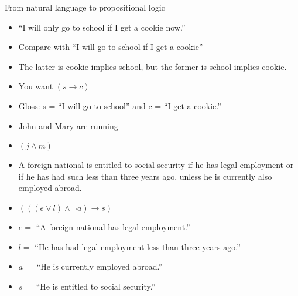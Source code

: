 \documentclass[
  ignorenonframetext,
]{beamer}
\providecommand{\tightlist}{%
  \setlength{\itemsep}{0pt}\setlength{\parskip}{0pt}}
\begin{document}
\begin{frame}{From natural language to propositional logic}
\protect\hypertarget{from-natural-language-to-propositional-logic}{}

\begin{itemize}[<+->]
\tightlist
\item
  ``I will only go to school if I get a cookie now.''
\item
  Compare with ``I will go to school if I get a cookie''
\item
  The latter is cookie implies school, but the former is school implies
  cookie.
\item
  You want \((s \rightarrow c)\)
\item
  Gloss: s = ``I will go to school'' and c = ``I get a cookie.''
\item
  John and Mary are running
\item
  \((j \wedge m)\)
\item
  A foreign national is entitled to social security if he has legal
  employment or if he has had such less than three years ago, unless he
  is currently also employed abroad.
\item
  \((((e \vee l) \wedge {\neg}a) \rightarrow s)\)
\item
  \(e =\) ``A foreign national has legal employment.''
\item
  \(l =\) ``He has had legal employment less than three years ago.''
\item
  \(a =\) ``He is currently employed abroad.''
\item
  \(s =\) ``He is entitled to social security.''
\end{itemize}

\end{frame}
\end{document}
